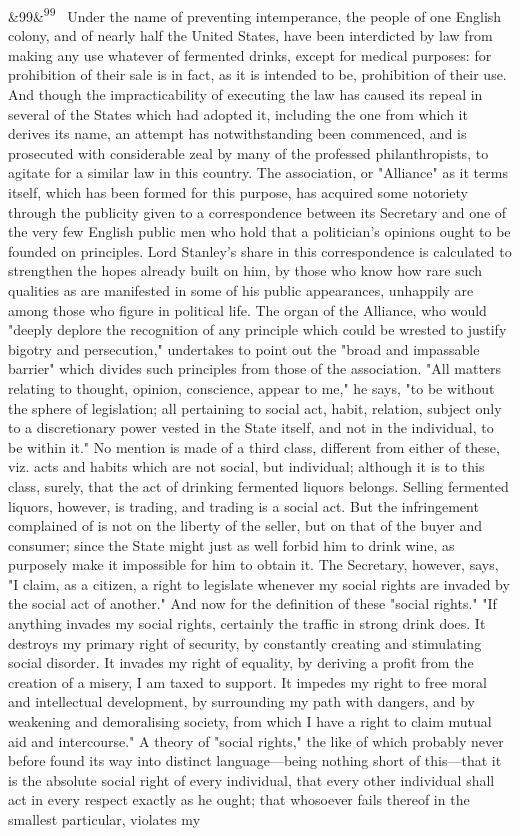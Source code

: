 \documentclass[12pt]{article}
\newcommand{\para}[1][]{\par\noindent\ifx&#1&\else\textsuperscript{\footnotesize #1}~\fi}
\begin{document}
\para[99] Under the name of preventing intemperance, the people of one English colony, and of nearly half the United States, have been interdicted by law from making any use whatever of fermented drinks, except for medical purposes: for prohibition of their sale is in fact, as it is intended to be, prohibition of their use. And though the impracticability of executing the law has caused its repeal in several of the States which had adopted it, including the one from which it derives its name, an attempt has notwithstanding been commenced, and is prosecuted with considerable zeal by many of the professed philanthropists, to agitate for a similar law in this country. The association, or "Alliance" as it terms itself, which has been formed for this purpose, has acquired some notoriety through the publicity given to a correspondence between its Secretary and one of the very few English public men who hold that a politician's opinions ought to be founded on principles. Lord Stanley's share in this correspondence is calculated to strengthen the hopes already built on him, by those who know how rare such qualities as are manifested in some of his public appearances, unhappily are among those who figure in political life. The organ of the Alliance, who would "deeply deplore the recognition of any principle which could be wrested to justify bigotry and persecution," undertakes to point out the "broad and impassable barrier" which divides such principles from those of the association. "All matters relating to thought, opinion, conscience, appear to me," he says, "to be without the sphere of legislation; all pertaining to social act, habit, relation, subject only to a discretionary power vested in the State itself, and not in the individual, to be within it." No mention is made of a third class, different from either of these, viz. acts and habits which are not social, but individual; although it is to this class, surely, that the act of drinking fermented liquors belongs. Selling fermented liquors, however, is trading, and trading is a social act. But the infringement complained of is not on the liberty of the seller, but on that of the buyer and consumer; since the State might just as well forbid him to drink wine, as purposely make it impossible for him to obtain it. The Secretary, however, says, "I claim, as a citizen, a right to legislate whenever my social rights are invaded by the social act of another." And now for the definition of these "social rights." "If anything invades my social rights, certainly the traffic in strong drink does. It destroys my primary right of security, by constantly creating and stimulating social disorder. It invades my right of equality, by deriving a profit from the creation of a misery, I am taxed to support. It impedes my right to free moral and intellectual development, by surrounding my path with dangers, and by weakening and demoralising society, from which I have a right to claim mutual aid and intercourse." A theory of "social rights," the like of which probably never before found its way into distinct language---being nothing short of this---that it is the absolute social right of every individual, that every other individual shall act in every respect exactly as he ought; that whosoever fails thereof in the smallest particular, violates my 
\end{document}

